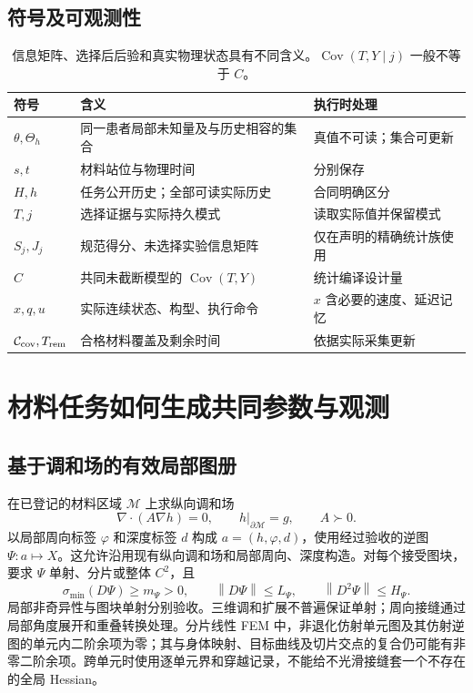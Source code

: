 \documentclass[UTF8,fontset=fandol,zihao=5,a4paper]{ctexart}
\newcommand{\norm}[1]{\left\lVert#1\right\rVert}
\DeclareMathOperator{\Cov}{Cov}\DeclareMathOperator{\im}{im}
\theoremstyle{definition}
\theoremstyle{remark}\newtheorem{remark}[theorem]{说明}
\numberwithin{equation}{section}
\begin{document}
\subsection{符号及可观测性}
\begin{table}[htbp]\centering\small
\begin{tabularx}{\linewidth}{p{.17\linewidth}Yp{.25\linewidth}}
\toprule 符号 & 含义 & 执行时处理\\\midrule
$\theta,\Theta_h$ & 同一患者局部未知量及与历史相容的集合 & 真值不可读；集合可更新\\
$s,t$ & 材料站位与物理时间 & 分别保存\\
$H,h$ & 任务公开历史；全部可读实际历史 & 合同明确区分\\
$T,j$ & 选择证据与实际持久模式 & 读取实际值并保留模式\\
$S_j,J_j$ & 规范得分、未选择实验信息矩阵 & 仅在声明的精确统计族使用\\
$C$ & 共同未截断模型的 $\Cov(T,Y)$ & 统计编译设计量\\
$x,q,u$ & 实际连续状态、构型、执行命令 & $x$ 含必要的速度、延迟记忆\\
$\mathcal C_{\rm cov},T_{\rm rem}$ & 合格材料覆盖及剩余时间 & 依据实际采集更新\\
\bottomrule
\end{tabularx}
\caption{信息矩阵、选择后后验和真实物理状态具有不同含义。$\Cov(T,Y\mid j)$ 一般不等于 $C$。}
\end{table}

\section{材料任务如何生成共同参数与观测}
\label{sec:material}
\subsection{基于调和场的有效局部图册}
在已登记的材料区域 $\mathcal M$ 上求纵向调和场
\begin{equation}
\nabla\!\cdot(A\nabla h)=0,\qquad h|_{\partial\mathcal M}=g,
\qquad A\succ0.
\label{eq:harmonic73}
\end{equation}
以局部周向标签 $\varphi$ 和深度标签 $d$ 构成 $a=(h,\varphi,d)$，使用经过验收的逆图 $\Psi:a\mapsto X$。这允许沿用现有纵向调和场和局部周向、深度构造。对每个接受图块，要求 $\Psi$ 单射、分片或整体 $C^2$，且
\begin{equation}
\sigma_{\min}(D\Psi)\ge m_\Psi>0,\qquad
\norm{D\Psi}\le L_\Psi,\qquad
\norm{D^2\Psi}\le H_\Psi.
\label{eq:chartcheck}
\end{equation}
局部非奇异性与图块单射分别验收。三维调和扩展不普遍保证单射\cite{laugesen}；周向接缝通过局部角度展开和重叠转换处理。分片线性 FEM 中，非退化仿射单元图及其仿射逆图的单元内二阶余项为零；其与身体映射、目标曲线及切片交点的复合仍可能有非零二阶余项。跨单元时使用逐单元界和穿越记录，不能给不光滑接缝套一个不存在的全局 Hessian。
\end{document}
